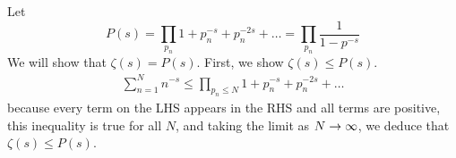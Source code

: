 \documentclass{homework}
\begin{document}
                                                                                    \begin{solution}
                                                                                    Let 
                                                                                    \[
                                                                                    P(s) = \prod_{p_n} 1 + p^{-s}_n + p^{-2s}_n + \dots = \prod_{p_n} \frac{1}{1-p^{-s}}
                                                                                    \]
                                                                                    We will show that $\zeta(s) = P(s)$. First, we show $\zeta(s) \leq P(s)$.
                                                                                    \begin{align*}
                                                                                    \sum_{n=1}^N n^{-s} \leq \prod_{p_n\leq N} 1 + p^{-s}_n + p^{-2s}_n + \dots
                                                                                    \end{align*}
                                                                                    because every term on the LHS appears in the RHS and all terms are positive, this inequality is true for all $N$, and taking the limit as $N\to\infty$, we deduce that $\zeta(s) \leq P(s)$.


\end{solution}
\end{document}
